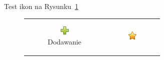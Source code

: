 \documentclass[a4paper,12pt]{article}
\begin{document}
Test ikon na Rysunku~\ref{icons:add}
\begin{figure}[!htb]
\centering
\begin{tabular}{cc}
\hline \begin{subfigure}[b]{0.2\textwidth} 
			\includegraphics[width=\textwidth]{images/add}
            \caption{Dodawanie}
            \label{icons:add} 
       \end{subfigure} &  
	   \begin{subfigure}[b]{0.2\textwidth} 
			\includegraphics[width=\textwidth]{images/about}

\end{subfigure}
\end{tabular}
\end{figure}
\end{document}
